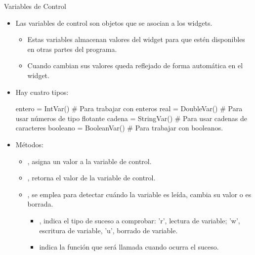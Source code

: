 \documentclass[10pt, envcountsect , spanish]{beamer}
\begin{document}
\begin{frame}[fragile]{Variables de Control}

\begin{itemize}
\item Las variables de control son objetos que se asocian a los widgets.
	\begin{itemize}
	\item Estas variables almacenan valores del widget para que estén disponibles en otras partes del programa.
	\item Cuando cambian sus valores queda reflejado de forma automática en el widget.
	\end{itemize}
\item Hay cuatro tipos:
\begin{pyverbatim}[][frame=single]
entero   = IntVar()      # Para trabajar con enteros
real     = DoubleVar()   # Para usar números de tipo flotante
cadena   = StringVar()   # Para usar cadenas de caracteres
booleano = BooleanVar()  # Para trabajar con booleanos.
\end{pyverbatim}
\item Métodos:
\begin{itemize}
\item {}, asigna un valor a la variable de control.
\item {}, retorna el valor de la variable de control.
\item {}, se emplea para detectar cuándo la variable es leída, cambia su valor o es borrada.
	\begin{itemize}
	\item {}, indica el tipo de suceso a comprobar: 'r', lectura de variable; 'w', escritura de variable, 'u', borrado de variable.
	\item {} indica la función que será llamada cuando ocurra el suceso.
	\end{itemize}
\end{itemize}
\end{itemize}
\end{frame}
\end{document}
